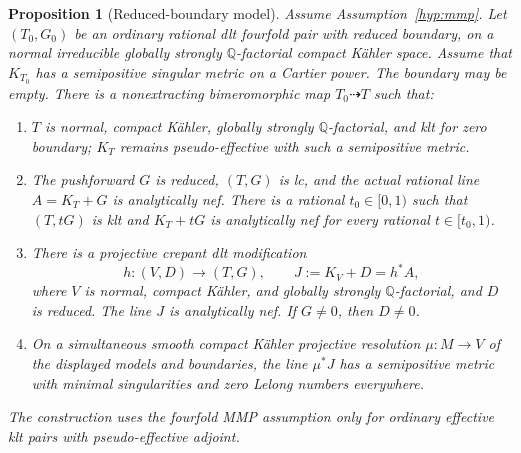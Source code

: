 \documentclass[11pt,letterpaper]{article}
\newcommand{\Q}{\mathbb{Q}}
\newtheorem{proposition}[theorem]{Proposition}
\theoremstyle{definition}
\theoremstyle{remark}
\begin{document}
\begin{proposition}[Reduced-boundary model]
\label{bir:reduced-model}
Assume Assumption~\ref{hyp:mmp}.  Let $(T_0,G_0)$ be an ordinary
rational dlt fourfold pair with reduced boundary, on a normal
irreducible globally strongly $\Q$-factorial compact K\"ahler space.
Assume that $K_{T_0}$ has a semipositive singular metric on a Cartier
power.  The boundary may be empty.  There is a nonextracting
bimeromorphic map $T_0\dashrightarrow T$ such that:
\begin{enumerate}[label=\textup{(\roman*)}]
\item $T$ is normal, compact K\"ahler, globally strongly
$\Q$-factorial, and klt for zero boundary; $K_T$ remains
pseudo-effective with such a semipositive metric.
\item The pushforward $G$ is reduced, $(T,G)$ is lc, and the
actual rational line $A=K_T+G$ is analytically nef.  There is a
rational $t_0\in[0,1)$ such that $(T,tG)$ is klt and
$K_T+tG$ is analytically nef for every rational
$t\in[t_0,1)$.
\item There is a projective crepant dlt modification
\begin{equation}
 h:(V,D)\longrightarrow(T,G),\qquad
 J:=K_V+D=h^*A,
 \label{bir:reduced-adjoint}
\end{equation}
where $V$ is normal, compact K\"ahler, and globally strongly
$\Q$-factorial, and $D$ is reduced.  The line $J$ is analytically
nef.  If $G\ne0$, then $D\ne0$.
\item On a simultaneous smooth compact K\"ahler projective
resolution $\mu:M\to V$ of the displayed models and boundaries,
the line $\mu^*J$ has a semipositive metric with minimal
singularities and zero Lelong numbers everywhere.
\end{enumerate}
The construction uses the fourfold MMP assumption only for ordinary
effective klt pairs with pseudo-effective adjoint.
\end{proposition}
\end{document}
